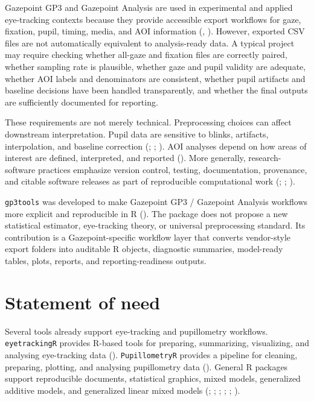 \documentclass[
]{article}
\begin{document}
Gazepoint GP3 and Gazepoint Analysis are used in experimental and
applied eye-tracking contexts because they provide accessible export
workflows for gaze, fixation, pupil, timing, media, and AOI information
(,
). However, exported CSV files are not
automatically equivalent to analysis-ready data. A typical project may
require checking whether all-gaze and fixation files are correctly
paired, whether sampling rate is plausible, whether gaze and pupil
validity are adequate, whether AOI labels and denominators are
consistent, whether pupil artifacts and baseline decisions have been
handled transparently, and whether the final outputs are sufficiently
documented for reporting.

These requirements are not merely technical. Preprocessing choices can
affect downstream interpretation. Pupil data are sensitive to blinks,
artifacts, interpolation, and baseline correction
(;
;
). AOI analyses depend
on how areas of interest are defined, interpreted, and reported
(). More generally,
research-software practices emphasize version control, testing,
documentation, provenance, and citable software releases as part of
reproducible computational work (; ;
).

\texttt{gp3tools} was developed to make Gazepoint GP3 / Gazepoint
Analysis workflows more explicit and reproducible in R
(). The package does not
propose a new statistical estimator, eye-tracking theory, or universal
preprocessing standard. Its contribution is a Gazepoint-specific
workflow layer that converts vendor-style export folders into auditable
R objects, diagnostic summaries, model-ready tables, plots, reports, and
reporting-readiness outputs.

\section{Statement of need}\label{statement-of-need}

Several tools already support eye-tracking and pupillometry workflows.
\texttt{eyetrackingR} provides R-based tools for preparing, summarizing,
visualizing, and analysing eye-tracking data
().
\texttt{PupillometryR} provides a pipeline for cleaning, preparing,
plotting, and analysing pupillometry data
(). General R packages support
reproducible documents, statistical graphics, mixed models, generalized
additive models, and generalized linear mixed models
(;
;
;
;
;
).
\end{document}
